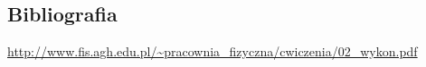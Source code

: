 \documentclass[a4paper,12pt]{article}
\begin{document}
\begin{justify}
\section{Bibliografia}

\begingroup
\renewcommand{\section}[2]{}%
\begin{thebibliography}{}
 \url{http://www.fis.agh.edu.pl/~pracownia_fizyczna/cwiczenia/02_wykon.pdf}
\end{thebibliography}
\endgroup

\end{justify}
\end{document}
